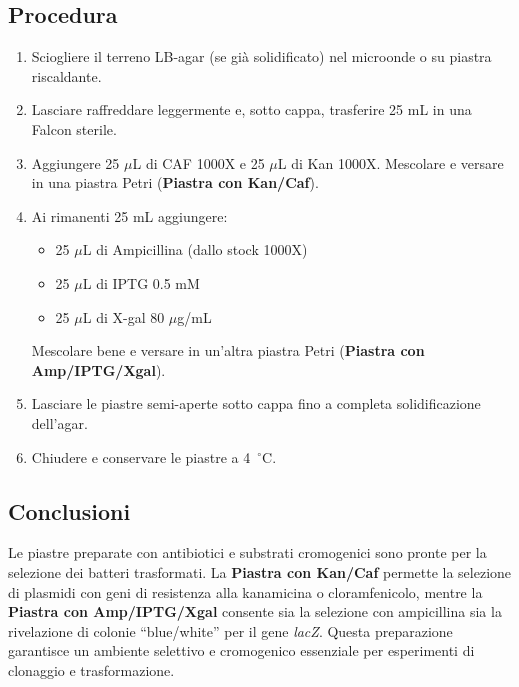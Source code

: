 \subsection{Procedura}
\begin{enumerate}\footnotesize
  \item Sciogliere il terreno LB-agar (se già solidificato) nel microonde o su piastra riscaldante.
  \item Lasciare raffreddare leggermente e, sotto cappa, trasferire 25 mL in una Falcon sterile.
  \item Aggiungere 25 $\mu$L di CAF 1000X e 25 $\mu$L di Kan 1000X. Mescolare e versare in una piastra Petri (\textbf{Piastra con Kan/Caf}).
  \item Ai rimanenti 25 mL aggiungere:
    \begin{itemize}
      \item 25 $\mu$L di Ampicillina (dallo stock 1000X)
      \item 25 $\mu$L di IPTG 0.5 mM
      \item 25 $\mu$L di X-gal 80 $\mu$g/mL
    \end{itemize}
    Mescolare bene e versare in un’altra piastra Petri (\textbf{Piastra con Amp/IPTG/Xgal}).
  \item Lasciare le piastre semi-aperte sotto cappa fino a completa solidificazione dell’agar.
  \item Chiudere e conservare le piastre a 4~$^\circ$C.
\end{enumerate}

\subsection{Conclusioni}
Le piastre preparate con antibiotici e substrati cromogenici sono pronte per la selezione dei batteri trasformati. La \textbf{Piastra con Kan/Caf} permette la selezione di plasmidi con geni di resistenza alla kanamicina o cloramfenicolo, mentre la \textbf{Piastra con Amp/IPTG/Xgal} consente sia la selezione con ampicillina sia la rivelazione di colonie “blue/white” per il gene \textit{lacZ}. Questa preparazione garantisce un ambiente selettivo e cromogenico essenziale per esperimenti di clonaggio e trasformazione.

\newpage
